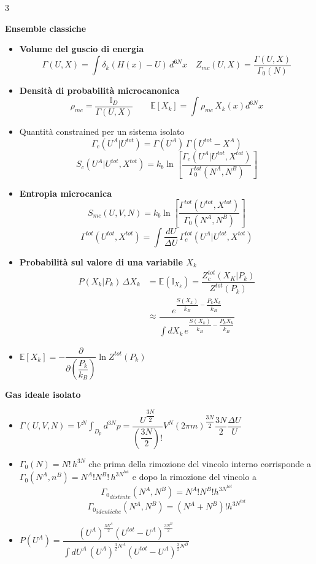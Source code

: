 \documentclass[10pt,a4paper]{report}
\begin{document}
\begin{multicols*}{3}
\begin{center}
\columnbreak
\textbf{\large Ensemble classiche}
\begin{itemize}[label=$\cdot$]
\item \textbf{Volume del guscio di energia}
\[
\Gamma(U,X)=\int \delta_k(H(x)-U)\, d^{6N}x \quad Z_{mc}(U,X)=\dfrac{\Gamma(U,X)}{\Gamma_0(N)}
\]
\item \textbf{Densità di probabilità microcanonica}
\[
\rho_{mc}=\dfrac{\mathbb{I}_D}{\Gamma(U,X)} \qquad \mathbb{E}[X_k]=\int \rho_{mc}\, X_k(x) d^{6N}x
\]
\item Quantità constrained per un sistema isolato 
\[
\Gamma_c(U^A|U^{tot})=\Gamma(U^A)\,\Gamma(U^{tot}-X^A)
\]
\[
S_c(U^A|U^{tot},X^{tot})=k_b\ln\left[\dfrac{\Gamma_c(U^A|U^{tot},X^{tot})}{\Gamma_0^{tot}(N^A,N^B)}\right]
\]
\item \textbf{Entropia  microcanica}
\[
S_{mc}(U,V,N)=k_b\ln\left[ \dfrac{\Gamma^{tot}(U^{tot},X^{tot})}{\Gamma_0(N^A,N^B)}\right]
\]
\[
\Gamma^{tot}(U^{tot},X^{tot})=\int\dfrac{dU}{\Delta U}\,\Gamma_c^{tot}(U^A|U^{tot},X^{tot})
\]
\item \textbf{Probabilità sul valore di una variabile $X_k$}
\begin{align*}
P(X_k|P_k)\,\Delta X_k&=\mathbb{E}(\mathbb{I}_{X_k})=\dfrac{Z_c^{tot}(X_K|P_k)}{Z^{tot}(P_k)}\\
& \approx \dfrac{e^{\dfrac{S(X_k)}{k_B} - \dfrac{P_kX_k}{k_B} }}{\int dX_k\, e^{\dfrac{S(X_k)}{k_B} - \dfrac{P_kX_k}{k_B} }}
\end{align*}
\item $\mathbb{E}[X_k]=-\dfrac{\partial}{\partial\left( \dfrac{P_k}{k_B} \right)}\ln Z^{tot}(P_k)$
\end{itemize}

\textbf{Gas ideale isolato}
\begin{itemize}[label=$\cdot$]
\item $\Gamma(U,V,N)=V^N\int_{D_p}d^{3N}p=\dfrac{U^{\dfrac{3N}{2}}}{\left( \dfrac{3N}{2}\right)!}V^N (2\pi m)^{\dfrac{3N}{2}} \dfrac{3N}{2} \dfrac{\Delta U}{U}$
\item $\Gamma_0(N)=N!\,h^{3N}$ che prima della rimozione del vincolo interno corrisponde a $\Gamma_0(N^A,n^B)=N^A!N^B!\,h^{3N^{tot}}$ e dopo la rimozione del vincolo a \\ \[ \left.\Gamma_0\right._{distinte}(N^A,N^B)=N^A!N^B!h^{3N^{tot}}\]\[ \left.\Gamma_0\right._{identiche}(N^A,N^B)=(N^A+N^B)!h^{3N^{tot}}\]
\item $P(U^A)=\dfrac{(U^A)^{\frac{3N^A}{2}} (U^{tot}-U^A)^{\frac{3N^B}{2}} }{\int dU^{A}\, (U^A)^{\frac{3}{2}N^A}(U^{tot}-U^A)^{\frac{3}{2}N^B } }$
\end{itemize}


\end{center}
\end{multicols*}
\end{document}
